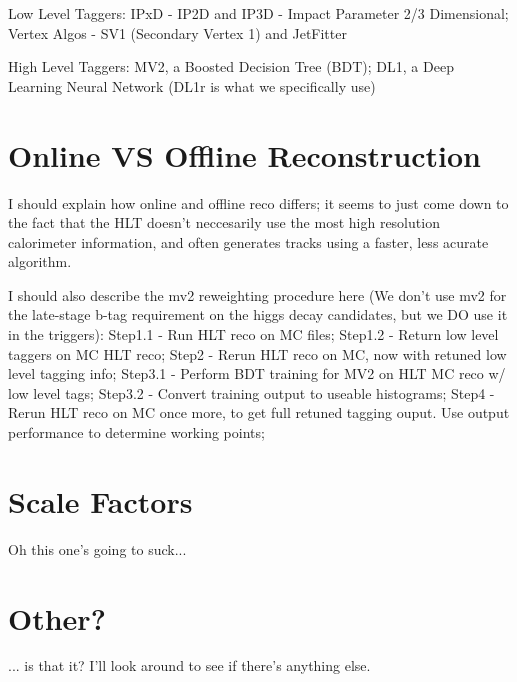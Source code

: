         Low Level Taggers:
            IPxD - IP2D and IP3D - Impact Parameter 2/3 Dimensional; 
            Vertex Algos - SV1 (Secondary Vertex 1) and JetFitter

        High Level Taggers:
            MV2, a Boosted Decision Tree (BDT);
            DL1, a Deep Learning Neural Network (DL1r is what we specifically use)
        \cite{bjet_id_and_performance}
        \cite{btagging_optimisation}

    \section{Online VS Offline Reconstruction}
        I should explain how online and offline reco differs;
            it seems to just come down to the fact that the HLT doesn't neccesarily use the most high resolution calorimeter information,
            and often generates tracks using a faster, less acurate algorithm.
            
        I should also describe the mv2 reweighting procedure here
            (We don't use mv2 for the late-stage b-tag requirement on the higgs decay candidates,
            but we DO use it in the triggers):
            Step1.1 - Run HLT reco on MC files;
            Step1.2 - Return low level taggers on MC HLT reco;
            Step2   - Rerun HLT reco on MC, now with retuned low level tagging info;
            Step3.1 - Perform BDT training for MV2 on HLT MC reco w/ low level tags;
            Step3.2 - Convert training output to useable histograms;
            Step4   - Rerun HLT reco on MC once more, to get full retuned tagging ouput. Use output performance to determine working points;


    \section{Scale Factors}
        Oh this one's going to suck...


    \section{Other?}
        ... is that it? I'll look around to see if there's anything else.



